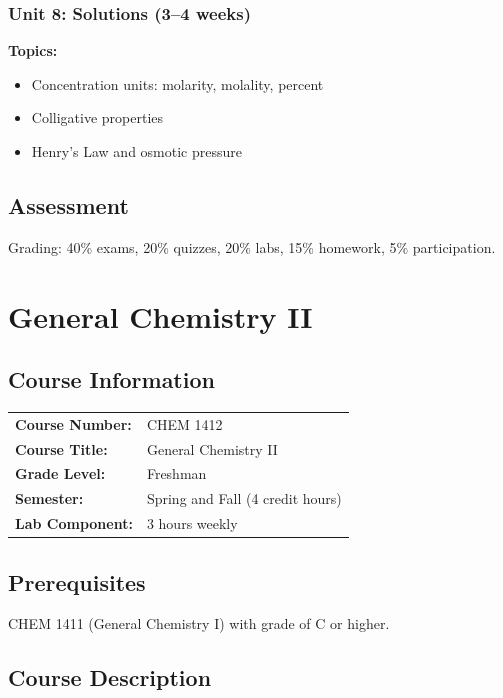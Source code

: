 \documentclass[12pt,oneside]{book}
\begin{document}
\subsection{Unit 8: Solutions (3--4 weeks)}

\textbf{Topics:}
\begin{itemize}
    \item Concentration units: molarity, molality, percent
    \item Colligative properties
    \item Henry's Law and osmotic pressure
\end{itemize}

\section{Assessment}

Grading: 40\% exams, 20\% quizzes, 20\% labs, 15\% homework, 5\% participation.


\chapter{General Chemistry II}

\section{Course Information}

\begin{tabular}{ll}
\textbf{Course Number:} & CHEM 1412 \\
\textbf{Course Title:} & General Chemistry II \\
\textbf{Grade Level:} & Freshman \\
\textbf{Semester:} & Spring and Fall (4 credit hours) \\
\textbf{Lab Component:} & 3 hours weekly \\
\end{tabular}

\section{Prerequisites}

CHEM 1411 (General Chemistry I) with grade of C or higher.

\section{Course Description}
\end{document}
